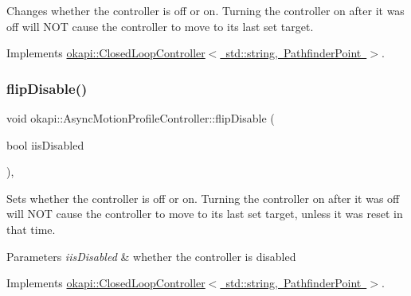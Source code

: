 Changes whether the controller is off or on. Turning the controller on after it was off will N\+OT cause the controller to move to its last set target. 

Implements \mbox{\hyperlink{classokapi_1_1ClosedLoopController_a9de69b60885df41cd2164fe1a23f34d3}{okapi\+::\+Closed\+Loop\+Controller$<$ std\+::string, Pathfinder\+Point $>$}}.

\mbox{\label{classokapi_1_1AsyncMotionProfileController_a3dc30b14b36f1fc1fc61c9c45ced002e}} 
\subsubsection{\texorpdfstring{flipDisable()}{flipDisable()}\hspace{0.1cm}{\footnotesize\ttfamily [2/2]}}
{\footnotesize\ttfamily void okapi\+::\+Async\+Motion\+Profile\+Controller\+::flip\+Disable (\begin{DoxyParamCaption}\item[{bool}]{iis\+Disabled }\end{DoxyParamCaption})\hspace{0.3cm}{\ttfamily [override]}, {\ttfamily [virtual]}}

Sets whether the controller is off or on. Turning the controller on after it was off will N\+OT cause the controller to move to its last set target, unless it was reset in that time.


\begin{DoxyParams}{Parameters}
{\em iis\+Disabled} & whether the controller is disabled \\
\hline
\end{DoxyParams}


Implements \mbox{\hyperlink{classokapi_1_1ClosedLoopController_a768cd1db40ce9cd5c89b20be6e838ccc}{okapi\+::\+Closed\+Loop\+Controller$<$ std\+::string, Pathfinder\+Point $>$}}.

\mbox{\label{classokapi_1_1AsyncMotionProfileController_ace5f9053d3455e6f5e69c63f1196521e}} 
